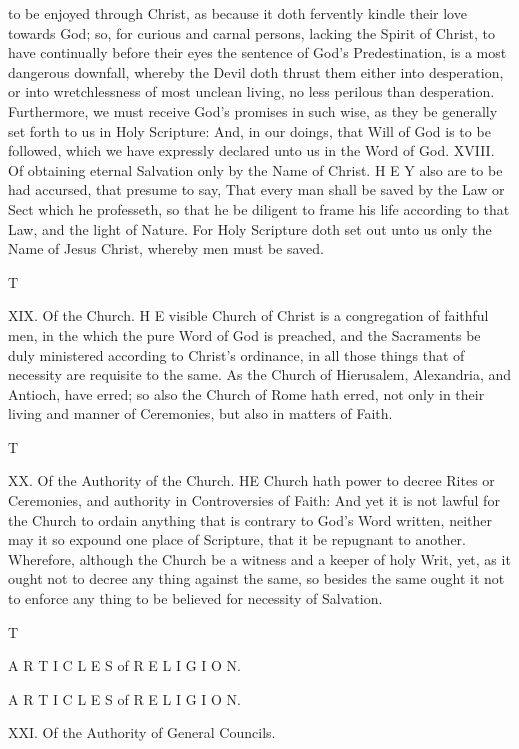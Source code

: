 to be enjoyed through Christ, as because it doth fervently kindle their love towards God; so, for curious and carnal persons, lacking the Spirit of Christ, to have continually before their eyes the sentence of God’s Predestination, is a most dangerous downfall, whereby the Devil doth thrust them either into desperation, or into wretchlessness of most unclean living, no less perilous than desperation. Furthermore, we must receive God's promises in such wise, as they be generally set forth to us in Holy Scripture: And, in our doings, that Will of God is to be followed, which we have expressly declared unto us in the Word of God. XVIII. Of obtaining eternal Salvation only by the Name of Christ. H E Y also are to be had accursed, that presume to say, That every man shall be saved by the Law or Sect which he professeth, so that he be diligent to frame his life according to that Law, and the light of Nature. For Holy Scripture doth set out unto us only the Name of Jesus Christ, whereby men must be saved.

T

XIX. Of the Church. H E visible Church of Christ is a congregation of faithful men, in the which the pure Word of God is preached, and the Sacraments be duly ministered according to Christ’s ordinance, in all those things that of necessity are requisite to the same. As the Church of Hierusalem, Alexandria, and Antioch, have erred; so also the Church of Rome hath erred, not only in their living and manner of Ceremonies, but also in matters of Faith.

T

XX. Of the Authority of the Church. HE Church hath power to decree Rites or Ceremonies, and authority in Controversies of Faith: And yet it is not lawful for the Church to ordain anything that is contrary to God’s Word written, neither may it so expound one place of Scripture, that it be repugnant to another. Wherefore, although the Church be a witness and a keeper of holy Writ, yet, as it ought not to decree any thing against the same, so besides the same ought it not to enforce any thing to be believed for necessity of Salvation.

T

A R T I C L E S of R E L I G I O N.

A R T I C L E S of R E L I G I O N.

XXI. Of the Authority of General Councils.

